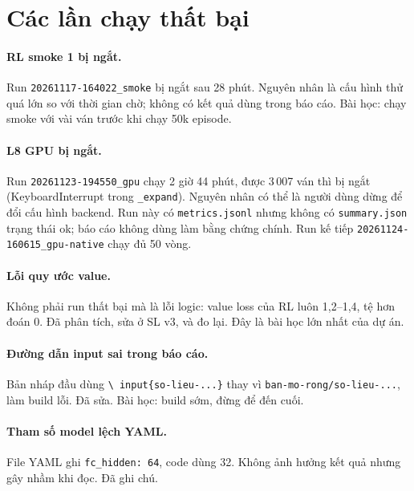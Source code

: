 \section{Các lần chạy thất bại}
\paragraph{RL smoke 1 bị ngắt.} Run \texttt{20261117-164022\_smoke} bị ngắt sau 28 phút. Nguyên
nhân là cấu hình thử quá lớn so với thời gian chờ; không có kết quả dùng trong báo cáo. Bài học:
chạy smoke với vài ván trước khi chạy 50k episode.

\paragraph{L8 GPU bị ngắt.} Run \texttt{20261123-194550\_gpu} chạy 2 giờ 44 phút, được 3\,007
ván thì bị ngắt (KeyboardInterrupt trong \texttt{\_expand}). Nguyên nhân có thể là người dùng
dừng để đổi cấu hình backend. Run này có \texttt{metrics.jsonl} nhưng không có
\texttt{summary.json} trạng thái ok; báo cáo không dùng làm bằng chứng chính. Run kế tiếp
\texttt{20261124-160615\_gpu-native} chạy đủ 50 vòng.

\paragraph{Lỗi quy ước value.} Không phải run thất bại mà là lỗi logic: value loss của RL luôn
1,2--1,4, tệ hơn đoán 0. Đã phân tích, sửa ở SL v3, và đo lại. Đây là bài học lớn nhất của dự án.

\paragraph{Đường dẫn input sai trong báo cáo.} Bản nháp đầu dùng \texttt{\textbackslash
input\{so-lieu-...\}} thay vì \texttt{ban-mo-rong/so-lieu-...}, làm build lỗi. Đã sửa. Bài học:
build sớm, đừng để đến cuối.

\paragraph{Tham số model lệch YAML.} File YAML ghi \texttt{fc\_hidden: 64}, code dùng 32. Không
ảnh hưởng kết quả nhưng gây nhầm khi đọc. Đã ghi chú.

